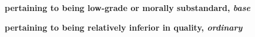 			\subparagraph{\texorpdfstring{}{}}
				\label{PHAULOS}
				
				
			
				\begin{compactdesc}
				
					\item[BDAG 934b] \textbf{}
						\begin{compactitem}
							\item[1] \textbf{pertaining to being low-grade or morally substandard, \textit{base}}
							\item[2] \textbf{pertaining to being relatively inferior in quality, \textit{ordinary}}
						\end{compactitem}
						
						
						
						
				\end{compactdesc}
				
				
